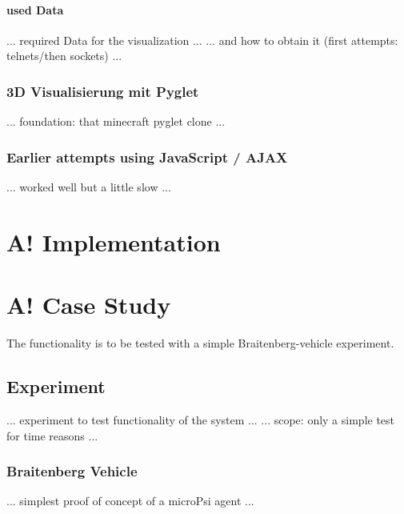 \paragraph{used Data}
... required Data for the visualization ...
... and how to obtain it (first attempts: telnets/then sockets) ...

\subsubsection{3D Visualisierung mit Pyglet}
... foundation: that minecraft pyglet clone ...

\subsubsection{Earlier attempts using JavaScript / AJAX}
... worked well but a little slow ...

\section{A! Implementation}

\section{A! Case Study}

The functionality is to be tested with a simple Braitenberg-vehicle experiment.

\subsection{Experiment}
... experiment to test functionality of the system ...
... scope: only a simple test for time reasons ...

\subsubsection{Braitenberg Vehicle}
... simplest proof of concept of a microPsi agent ...